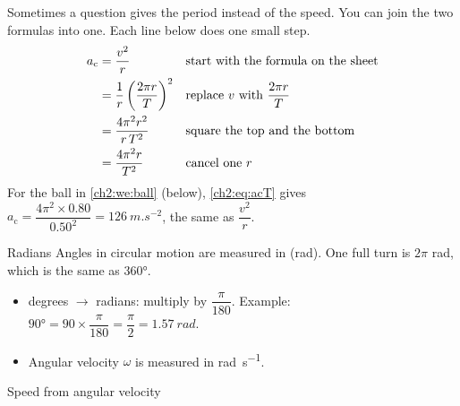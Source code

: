 Sometimes a question gives the period instead of the speed. You can join the
two formulas into one. Each line below does one small step.
\begin{align}
  a_\mathrm{c} &= \frac{v^2}{r}
     && \text{start with the formula on the sheet}\notag\\
  &= \frac{1}{r}\left(\frac{2\pi r}{T}\right)^{2}
     && \text{replace $v$ with $\dfrac{2\pi r}{T}$}\notag\\
  &= \frac{4\pi^2 r^2}{r\,T^2}
     && \text{square the top and the bottom}\notag\\
  &= \frac{4\pi^2 r}{T^2}
     && \text{cancel one $r$}\label{ch2:eq:acT}
\end{align}
For the ball in \cref{ch2:we:ball} (below), \cref{ch2:eq:acT} gives
$a_\mathrm{c} = \dfrac{4\pi^2 \times 0.80}{0.50^2} = \qty{126}{m.s^{-2}}$,
the same as $\dfrac{v^2}{r}$.

\begin{toolkit}{Radians}
Angles in circular motion are measured in  (rad).
One full turn is $2\pi$ rad, which is the same as \ang{360}.
\begin{itemize}
  \item degrees $\to$ radians: multiply by $\dfrac{\pi}{180}$.
        Example: $\ang{90} = 90 \times \dfrac{\pi}{180} = \dfrac{\pi}{2} = \qty{1.57}{rad}$.
  \item Angular velocity $\omega$ is measured in \si{rad.s^{-1}}.
\end{itemize}
\end{toolkit}

\begin{formulacard}[notonsheet]{Speed from angular velocity}
  \begin{symbols}
  \end{symbols}
\end{formulacard}

